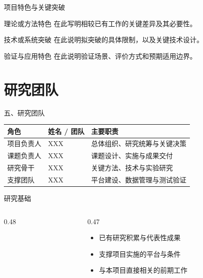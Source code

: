 \documentclass[10pt,aspectratio=169]{beamer}
\begin{document}
\begin{frame}{项目特色与关键突破}
  \begin{block}{理论或方法特色}
    在此写明相较已有工作的关键差异及其必要性。
  \end{block}
  \medskip
  \begin{block}{技术或系统突破}
    在此说明拟突破的具体限制，以及关键技术设计。
  \end{block}
  \medskip
  \begin{block}{验证与应用特色}
    在此说明验证场景、评价方式和预期适用边界。
  \end{block}
\end{frame}

\section{研究团队}
\begin{frame}{五、研究团队}
  \renewcommand{\arraystretch}{1.6}
  \begin{tabularx}{\linewidth}{@{}llX@{}}
    \toprule
    \textbf{角色} & \textbf{姓名 / 团队} & \textbf{主要职责}\\
    \midrule
    项目负责人 & XXX & 总体组织、研究统筹与关键决策\\
    课题负责人 & XXX & 课题设计、实施与成果交付\\
    研究骨干 & XXX & 关键方法、技术与实验研究\\
    支撑团队 & XXX & 平台建设、数据管理与测试验证\\
    \bottomrule
  \end{tabularx}
  \vspace{0.45cm}
\end{frame}

\begin{frame}{研究基础}
  \begin{columns}[c,onlytextwidth]
    \begin{column}{0.48\textwidth}
      \centering
    \end{column}
    \begin{column}{0.47\textwidth}
      \begin{itemize}
        \setlength{\itemsep}{0.75em}
        \item 已有研究积累与代表性成果
        \item 支撑项目实施的平台与条件
        \item 与本项目直接相关的前期工作
      \end{itemize}
    \end{column}
  \end{columns}
\end{frame}

\PCLthanks
\end{document}
